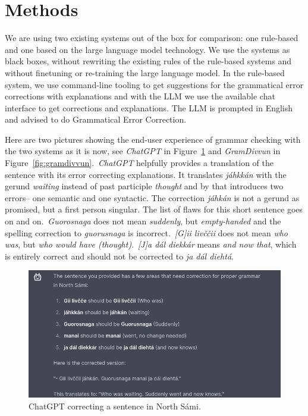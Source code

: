 \documentclass[free]{flammie}
\begin{document}
\section{Methods}

We are using two existing systems out of the box for comparison: one rule-based
and one based on the large language model technology. We use the systems as
black boxes, without rewriting the existing rules of the rule-based systems and
without finetuning or re-training the large language model. In the rule-based
system, we use command-line tooling to get suggestions for the grammatical error
corrections with explanations and with the LLM we use the available chat
interface to get corrections and explanations. The LLM is prompted in English
and advised to do Grammatical Error Correction.

Here are two pictures showing the end-user experience of grammar checking with
the two systems as it is now, see \textit{ChatGPT} in Figure~\ref{fig:chatgpt}
and \textit{GramDivvun} in Figure~\ref{fig:gramdivvun}.\ \textit{ChatGPT}
helpfully provides a translation of the sentence with its error correcting
explanations.  It translates \textit{jáhkkán} with the gerund \textit{waiting}
instead of past participle \textit{thought} and by that introduces two errors--
one semantic and one syntactic. The correction \textit{jáhkán} is not a gerund
as promised, but a first person singular. The list of flaws for this short
sentence goes on and on.\  \textit{Guorosnaga} does not mean \textit{suddenly},
but \textit{empty-handed} and the spelling correction to \textit{guorusnaga} is
incorrect.\ \textit{[G]ii livččii} does not mean \textit{who was}, but
\textit{who would have (thought)}.\  \textit{[J]a dál diekkár} means \textit{and
now that}, which is entirely correct and should not be corrected to \textit{ja
dál diehtá}.


\begin{figure}
    \includegraphics[width=\textwidth]{chatgpt-gramcheck.png}
    \caption{ChatGPT correcting a sentence in North Sámi.\label{fig:chatgpt}}
\end{figure}
\end{document}
